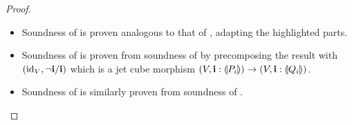 \documentclass[a4paper]{memoir}
\begin{document}
\begin{proof}
\begin{itemize}
\begin{itemize}
\begin{itemize}
\begin{itemize}
				\end{itemize}
			\end{itemize}
		\end{itemize}
		
		\item Soundness of  is proven analogous to that of , adapting the highlighted parts.
		
		\item Soundness of  is proven from soundness of \allowbreak {} by precomposing the result with $(\mathrm{id}_V, \lnot \mathbf{i} / \mathbf{i})$ which is a jet cube morphism $(V, \mathbf{i} : {\llparenthesis P_i \rrparenthesis}) \to (V, \mathbf{i} : {\llparenthesis Q_i \rrparenthesis})$.
		
		\item Soundness of  is similarly proven from soundness of .
		

\end{itemize}
\end{proof}
\end{document}
